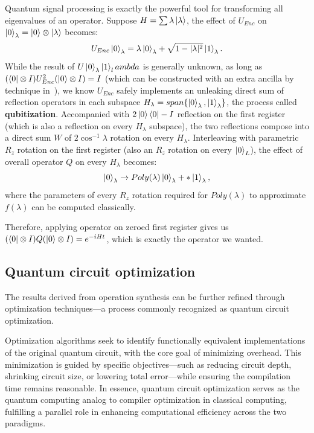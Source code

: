 \documentclass[a4paper,onecolumn,11pt,unpublished]{quantumarticle}
\begin{document}
Quantum signal processing is exactly the powerful tool for transforming all eigenvalues of an operator.
Suppose $H=\sum \lambda\ket{\lambda}$, the effect of $U_{Enc}$ on $\ket{0}_\lambda = \ket{0}\otimes \ket{\lambda}$ becomes:
\begin{equation}
  U_{Enc}\ket{0}_\lambda = \lambda \ket{0}_\lambda + \sqrt{1-|\lambda|^2}\ket{1}_\lambda.
\end{equation}
While the result of $U\ket{0}_\lambda\ket{1}_lambda$ is generally unknown, as long as $(\bra{0}\otimes I)U_{Enc}^2(\ket{0}\otimes I)=I$ (which can be constructed with an extra ancilla by technique in~\cite{lowHamiltonianSimulationQubitization2019}), we know $U_{Enc}$ safely implements an unleaking direct sum of reflection operators in each subspace $H_\lambda = span\{\ket{0}_\lambda, \ket{1}_\lambda\}$, the process called \textbf{qubitization}.
Accompanied with $2\ket{0}\bra{0}-I$ reflection on the first register (which is also a reflection on every $H_\lambda$ subspace), the two reflections compose into a direct sum $W$ of $2\cos^{-1}\lambda$ rotation on every $H_\lambda$.
Interleaving with parametric $R_z$ rotation on the first register (also an $R_z$ rotation on every $\ket{0}_L$), the effect of overall operator $Q$ on every $H_\lambda$ becomes:
\begin{equation}
  \ket{0}_\lambda \rightarrow Poly(\lambda) \ket{0}_\lambda + *\ket{1}_\lambda,
\end{equation}
where the parameters of every $R_z$ rotation required for $Poly(\lambda)$ to approximate $f(\lambda)$ can be computed classically.

Therefore, applying operator on zeroed first register gives us $(\bra{0}\otimes I)Q(\ket{0}\otimes I) = e^{-iHt}$, which is exactly the operator we wanted.

\fi

\subsection{Quantum circuit optimization}


The results derived from operation synthesis can be further refined through optimization techniques---a process commonly recognized as quantum circuit optimization.

Optimization algorithms seek to identify functionally equivalent implementations of the original quantum circuit, with the core goal of minimizing overhead. This minimization is guided by specific objectives---such as reducing circuit depth, shrinking circuit size, or lowering total error---while ensuring the compilation time remains reasonable. In essence, quantum circuit optimization serves as the quantum computing analog to compiler optimization in classical computing, fulfilling a parallel role in enhancing computational efficiency across the two paradigms.
\end{document}

